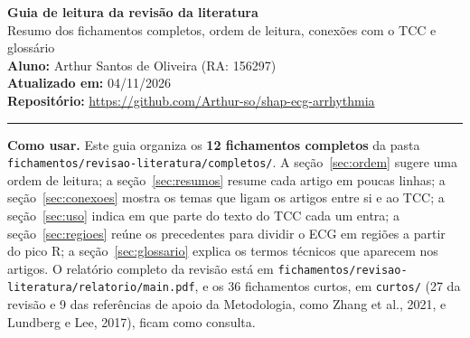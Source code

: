 \documentclass[11pt,a4paper]{article}
\begin{document}
\sloppy

\begin{center}
    {\LARGE \textbf{Guia de leitura da revisão da literatura}} \\[0.35em]
    {\large Resumo dos fichamentos completos, ordem de leitura, conexões com o TCC e glossário} \\[0.3em]
    \textbf{Aluno:} Arthur Santos de Oliveira (RA: 156297) \\[0.2em]
    \textbf{Atualizado em:} 04/11/2026 \\[0.2em]
    \textbf{Repositório:} \url{https://github.com/Arthur-so/shap-ecg-arrhythmia}
\end{center}
\vspace{-0.5em}
\hrule
\vspace{0.8em}

{\raggedright\textbf{Como usar.} Este guia organiza os \textbf{12 fichamentos completos} da pasta \texttt{fichamentos/revisao-literatura/completos/}. A seção~\ref{sec:ordem} sugere uma ordem de leitura; a seção~\ref{sec:resumos} resume cada artigo em poucas linhas; a seção~\ref{sec:conexoes} mostra os temas que ligam os artigos entre si e ao TCC; a seção~\ref{sec:uso} indica em que parte do texto do TCC cada um entra; a seção~\ref{sec:regioes} reúne os precedentes para dividir o ECG em regiões a partir do pico R; a seção~\ref{sec:glossario} explica os termos técnicos que aparecem nos artigos. O relatório completo da revisão está em \texttt{fichamentos/revisao-literatura/relatorio/main.pdf}, e os 36 fichamentos curtos, em \texttt{curtos/} (27 da revisão e 9 das referências de apoio da Metodologia, como Zhang et al., 2021, e Lundberg e Lee, 2017), ficam como consulta.\par}
\end{document}
